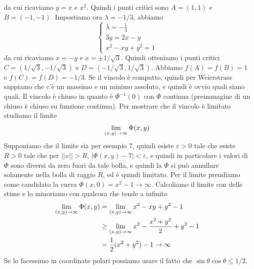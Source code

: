 \documentclass[a4paper]{article}
\begin{document}
\begin{snippetexercise}{}
\[    \]
    da cui ricaviamo \(y=x\) e \(x^2\).
    Quindi i punti critici sono \(A = (1,1)\) e \(B = (-1, -1)\).
    Impostiamo ora \(\lambda = -1/3\), abbiamo 
    \[
        \begin{cases}
            \lambda = -\frac13 \\
            3y = 2x-y \\
            x^2 - xy + y^2 = 1
        \end{cases}
    \]
    da cui ricaviamo \(x = -y\)
    e \(x = \pm 1 / \sqrt{3}\).
    Quindi otteniamo i punti critici \(C = (1 / \sqrt{3}, -1 / \sqrt{3})\)
    e \(D = (-1/\sqrt{3}, 1/ \sqrt{3})\).
    Abbiamo \(f(A) = f(B) = 1\) e \(f(C) = f(D) = -1/3\).
    Se il vincolo è compatto, quindi per Weierstrass sappiamo che c'è un massimo e un minimo
    assoluto, e quindi è ovvio quali siano quali.
    Il vincolo è chiuso in quanto è \(\Phi^{-1}(0)\) con \(\Phi\) continua (preimmagine di un chiuso è chiuso su funzione continua).
    Per mostrare che il vincolo è limitato studiamo il limite
    \begin{align*}
        \lim_{(x,y) \to \infty} \Phi(x,y)
    \end{align*}
    Supponiamo che il limite sia per esempio \(7\),
    quindi esiste \(\varepsilon > 0\) tale che esiste \(R>0\)
    tale che per \(||x||>R\), \(|\Phi(x,y) - 7| < \varepsilon\), e quindi
    in particolare i valori di \(\Phi\) sono diversi da zero fuori da tale bolla, e quindi la
    \(\Phi\) si può annullare solamente nella bolla di raggio \(R\), ed è quindi limitato.
    Per il limite prendiamo come candidato la curva \(\Phi(x,0) = x^2 - 1 \to \infty\).
    Calcoliamo il limite con delle stime e lo minoriamo con qualcosa che tende a infinito
    \begin{align*}
        \lim_{(x,y) \to \infty} \Phi(x,y)
        &= \lim_{(x,y) \to \infty} x^2 - xy + y^2 - 1 \\
        &\geq \lim_{(x,y) \to \infty} x^2 - \frac{x^2 + y^2}{2} + y^2 - 1 \\
        &= \frac{1}{2}(x^2 + y^2)- 1 \to \infty
    \end{align*}
    Se lo facessimo in coordinate polari possiamo usare il fatto che \(\sin\theta\cos\theta \leq 1/2\).
\end{snippetexercise}
\end{document}
